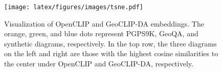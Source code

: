 \begin{figure}[t!]
    \centering
    \texttt{[image: latex/figures/images/tsne.pdf]}
    \caption{Visualization of OpenCLIP and GeoCLIP-DA embeddings. The orange, green, and blue dots represent PGPS9K, GeoQA, and synthetic diagrams, respectively. In the top row, the three diagrams on the left and right are those with the highest cosine similarities to the center under OpenCLIP and GeoCLIP-DA, respectively.}
    \label{fig:tsne}
    \vskip -0.19in
\end{figure}